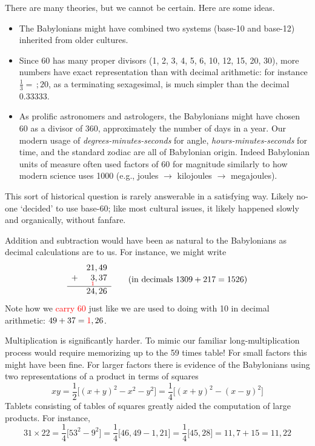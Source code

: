 
There are many theories, but we cannot be certain. Here are some ideas.
\begin{itemize}
  \item The Babylonians might have combined two systems (base-10 and base-12) inherited from older cultures.
  \item Since 60 has many proper divisors (1, 2, 3, 4, 5, 6, 10, 12, 15, 20, 30), more numbers have exact representation than with decimal arithmetic: for instance $\frac 13=\,;20$, as a terminating sexagesimal, is much simpler than the decimal $0.33333$.
  \item As prolific astronomers and astrologers, the Babylonians might have chosen 60 as a divisor of 360, approximately the number of days in a year. Our modern usage of \emph{degrees-minutes-seconds} for angle, \emph{hours-minutes-seconds} for time, and the standard zodiac are all of Babylonian origin. Indeed Babylonian units of measure often used factors of 60 for magnitude similarly to how modern science uses 1000 (e.g., joules $\rightarrow$ kilojoules $\rightarrow$ megajoules). 
\end{itemize}
This sort of historical question is rarely answerable in a satisfying way. Likely no-one `decided' to use base-60; like most cultural issues, it likely happened slowly and organically, without fanfare.


\label{babmult}

Addition and subtraction would have been as natural to the Babylonians as decimal calculations are to us. For instance, we might write
\[
	\begin{array}{rr@{,\,}r}
		&21&49\\
		+&\underset{\textcolor{red}{1}}{3}&37\\\hline
		&24&26\\
	\end{array} 
	\tag{in decimals $1309+217=1526$}
\]
Note how we \textcolor{red}{carry 60} just like we are used to doing with 10 in decimal arithmetic: $49+37=\textcolor{red}{1},26$.
\smallbreak

Multiplication is significantly harder. To mimic our familiar long-multiplication process would require memorizing up to the 59 times table! For small factors this might have been fine. For larger factors there is evidence of the Babylonians using two representations of a product in terms of squares
\[
	xy=\frac 12\bigl[(x+y)^2-x^2-y^2\bigr]=\frac 14\bigl[(x+y)^2-(x-y)^2\bigr]
\]
Tablets consisting of tables of squares greatly aided the computation of large products. For instance,
\[
	31\times 22 =\frac 14\bigl[53^2-9^2\bigr] 
	=\frac 14\bigl[46,49-1,21\bigr] 
	=\frac 14\bigl[45,28\bigr] 
	=11,7+15=11,22 \tag{$=682$}
\]


